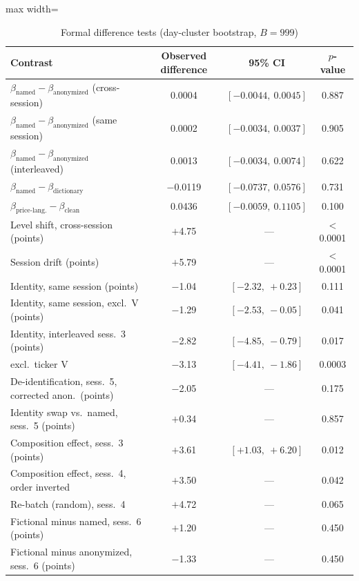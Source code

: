 \begin{table}[htbp]
\centering
\small
\caption{Formal difference tests (day-cluster bootstrap, $B=999$)}
\label{tab:diff}
\begin{threeparttable}
\begin{adjustbox}{max width=\textwidth}
\begin{tabular}{lccc}
\toprule
Contrast & Observed difference & 95\% CI & $p$-value \\
\midrule
$\beta_{\text{named}}-\beta_{\text{anonymized}}$ (cross-session) & 0.0004 & $[-0.0044,\ 0.0045]$ & 0.887 \\
$\beta_{\text{named}}-\beta_{\text{anonymized}}$ (same session) & 0.0002 & $[-0.0034,\ 0.0037]$ & 0.905 \\
$\beta_{\text{named}}-\beta_{\text{anonymized}}$ (interleaved) & 0.0013 & $[-0.0034,\ 0.0074]$ & 0.622 \\
$\beta_{\text{named}}-\beta_{\text{dictionary}}$ & $-$0.0119 & $[-0.0737,\ 0.0576]$ & 0.731 \\
$\beta_{\text{price-lang.}}-\beta_{\text{clean}}$ & 0.0436 & $[-0.0059,\ 0.1105]$ & 0.100 \\
Level shift, cross-session (points) & $+$4.75 &~--- & $<$0.0001 \\
Session drift (points) & $+$5.79 &~--- & $<$0.0001 \\
Identity, same session (points) & $-$1.04 & $[-2.32,\ +0.23]$ & 0.111 \\
Identity, same session, excl.\ V (points) & $-$1.29 & $[-2.53,\ -0.05]$ & 0.041 \\
Identity, interleaved sess.\ 3 (points) & $-$2.82 & $[-4.85,\ -0.79]$ & 0.017 \\
\quad excl.\ ticker V & $-$3.13 & $[-4.41,\ -1.86]$ & 0.0003 \\
De-identification, sess.\ 5, corrected anon.\ (points) & $-$2.05 &~--- & 0.175 \\
Identity swap vs.\ named, sess.\ 5 (points) & $+$0.34 &~--- & 0.857 \\
Composition effect, sess.\ 3 (points) & $+$3.61 & $[+1.03,\ +6.20]$ & 0.012 \\
Composition effect, sess.\ 4, order inverted & $+$3.50 &~--- & 0.042 \\
Re-batch (random), sess.\ 4 & $+$4.72 &~--- & 0.065 \\
Fictional minus named, sess.\ 6 (points) & $+$1.20 &~--- & 0.450 \\
Fictional minus anonymized, sess.\ 6 (points) & $-$1.33 &~--- & 0.450 \\

\end{tabular}
\end{adjustbox}
\end{threeparttable}
\end{table}
